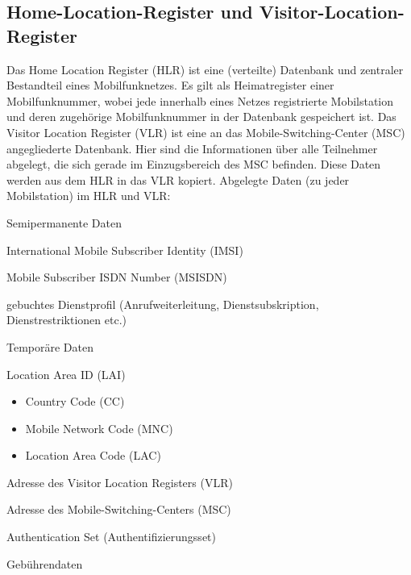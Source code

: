 \documentclass[loesung]{schulein}
\begin{document}
\subsection*{Home-Location-Register und Visitor-Location-Register}
Das Home Location Register (HLR) ist eine (verteilte) Datenbank und zentraler Bestandteil eines Mobilfunknetzes. Es gilt als Heimatregister einer Mobilfunknummer, wobei jede innerhalb eines Netzes registrierte Mobilstation und deren zugehörige Mobilfunknummer in der Datenbank gespeichert ist. 
Das Visitor Location Register (VLR) ist eine  an das Mobile-Switching-Center (MSC) angegliederte Datenbank. Hier sind die Informationen über alle Teilnehmer abgelegt, die sich gerade im Einzugsbereich des MSC befinden. Diese Daten werden aus dem HLR in das VLR kopiert.
Abgelegte Daten (zu jeder Mobilstation) im HLR und VLR:
\begin{smallitemize}
\item Semipermanente Daten
\begin{smallitemize}
\item International Mobile Subscriber Identity (IMSI)
\item Mobile Subscriber ISDN Number (MSISDN)
\item gebuchtes Dienstprofil (Anrufweiterleitung, Dienstsubskription, Dienstrestriktionen etc.)
\end{smallitemize}
\item Temporäre Daten
\begin{smallitemize}
\item Location Area ID (LAI)
\begin{itemize}
\item Country Code (CC)
\item Mobile Network Code (MNC)
\item Location Area Code (LAC)
\end{itemize} 
\item Adresse des Visitor Location Registers (VLR)
\item Adresse des Mobile-Switching-Centers (MSC)
\item Authentication Set (Authentifizierungsset)
\item Gebührendaten
\end{smallitemize}
\end{smallitemize}
\end{document}
